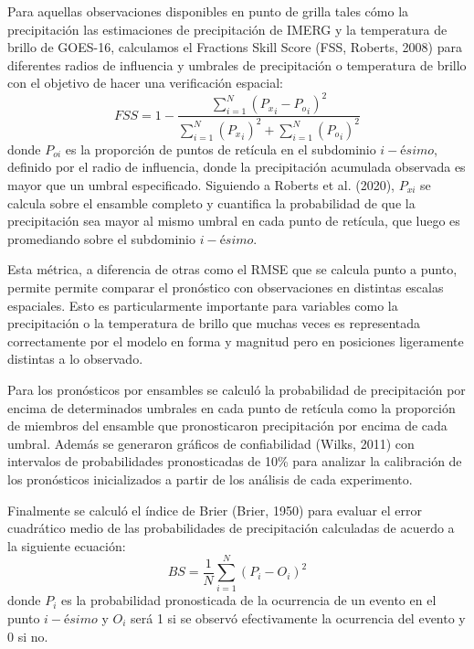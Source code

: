 \documentclass[12pt,oneside,a4paper]{reedthesis}
\begin{document}
Para aquellas observaciones disponibles en punto de grilla tales cómo la precipitación las estimaciones de precipitación de IMERG y la temperatura de brillo de GOES-16, calculamos el Fractions Skill Score (FSS, Roberts, 2008) para diferentes radios de influencia y umbrales de precipitación o temperatura de brillo con el objetivo de hacer una verificación espacial:
\begin{equation}
\mathit{FSS} = 1-\frac{\sum_{i=1}^{N} ({P_x}_i-{P_o}_i)^{2}}{\sum_{i=1}^{N} ({P_x}_i)^{2}+\sum_{i=1}^{N} ({P_o}_i)^{2}}
\label{eq:eq11}
\end{equation}
donde \(P_{oi}\) es la proporción de puntos de retícula en el subdominio \(i-ésimo\), definido por el radio de influencia, donde la precipitación acumulada observada es mayor que un umbral especificado. Siguiendo a Roberts et al. (2020), \(P_{xi}\) se calcula sobre el ensamble completo y cuantifica la probabilidad de que la precipitación sea mayor al mismo umbral en cada punto de retícula, que luego es promediando sobre el subdominio \(i-ésimo\).

Esta métrica, a diferencia de otras como el RMSE que se calcula punto a punto, permite permite comparar el pronóstico con observaciones en distintas escalas espaciales. Esto es particularmente importante para variables como la precipitación o la temperatura de brillo que muchas veces es representada correctamente por el modelo en forma y magnitud pero en posiciones ligeramente distintas a lo observado.

Para los pronósticos por ensambles se calculó la probabilidad de precipitación por encima de determinados umbrales en cada punto de retícula como la proporción de miembros del ensamble que pronosticaron precipitación por encima de cada umbral. Además se generaron gráficos de confiabilidad (Wilks, 2011) con intervalos de probabilidades pronosticadas de 10\% para analizar la calibración de los pronósticos inicializados a partir de los análisis de cada experimento.

Finalmente se calculó el índice de Brier (Brier, 1950) para evaluar el error cuadrático medio de las probabilidades de precipitación calculadas de acuerdo a la siguiente ecuación:
\begin{equation}
\mathit{BS} = \frac{1}{N}\sum_{i=1}^{N} ({P_i}-{O_i})^{2}
\label{eq:eq13}
\end{equation}
donde \(P_i\) es la probabilidad pronosticada de la ocurrencia de un evento en el punto \(i-ésimo\) y \(O_i\) será 1 si se observó efectivamente la ocurrencia del evento y 0 si no.
\end{document}
